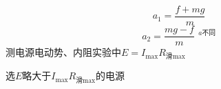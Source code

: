 
\[
a_1=\frac{f+mg}{m}
\]
\[
a_2=\frac{mg-f}{m}\ \,{}^{a\text{不同}}
\]
测电源电动势、内阻实验中\qquad $E=I_{\max}R_{\text{滑}\max}$

选$E$略大于$I_{\max}R_{\text{滑}\max}$的电源
